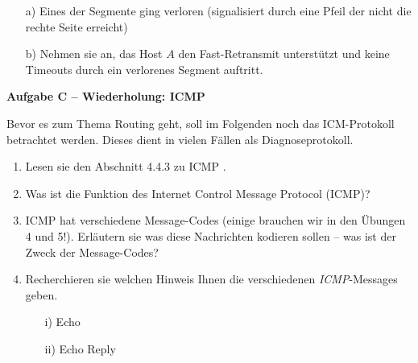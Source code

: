 \documentclass[paper=a4,fontsize=11pt]{scrartcl}%
\numberwithin{equation}{section}
\begin{document}
\begin{enumerate}
	\begin{itemize}
		\item[a)] Eines der Segmente ging verloren (signalisiert durch eine Pfeil der nicht die rechte Seite erreicht)
		\item[b)] Nehmen sie an, das Host $A$ den Fast-Retransmit unterstützt und keine Timeouts durch ein verlorenes Segment auftritt.
	\end{itemize}
\end{enumerate}

\begin{center}\Large{\textbf{Aufgabe C -- Wiederholung: ICMP}}\end{center}\vskip0.2in
Bevor es zum Thema Routing geht, soll im Folgenden noch das ICM-Protokoll betrachtet werden. Dieses dient in vielen Fällen als Diagnoseprotokoll.
\begin{enumerate}
	\item Lesen sie den Abschnitt 4.4.3 zu ICMP \cite[S. 353]{Kurose2012}. 
	\item Was ist die Funktion des Internet Control Message Protocol (ICMP)?
	\item ICMP hat verschiedene Message-Codes (einige brauchen wir in den Übungen 4 und 5!). Erläutern sie was diese Nachrichten kodieren sollen -- was ist der Zweck der Message-Codes?
	\item Recherchieren sie welchen Hinweis Ihnen die verschiedenen \emph{ICMP}-Messages geben.
		\begin{itemize}
			\item[i)] Echo
			\item[ii)] Echo Reply
		\end{itemize}
\end{enumerate}
\end{document}
